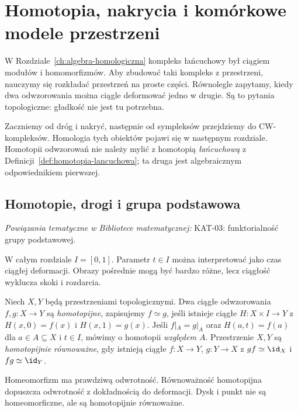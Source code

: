 \chapter{Homotopia, nakrycia i komórkowe modele przestrzeni}
\label{ch:topologia-algebraiczna-podstawy}

\providecommand{\atlasref}[2]{#2}


W Rozdziale~\ref{ch:algebra-homologiczna} kompleks łańcuchowy
był ciągiem modułów i homomorfizmów. Aby zbudować taki
kompleks z przestrzeni, nauczymy się rozkładać przestrzeń
na proste części. Równolegle zapytamy, kiedy dwa odwzorowania
można ciągle deformować jedno w drugie. Są to pytania
topologiczne: gładkość nie jest tu potrzebna.

Zaczniemy od dróg i nakryć, następnie od sympleksów
przejdziemy do CW-kompleksów. Homologia tych obiektów
pojawi się w następnym rozdziale. Homotopii odwzorowań
nie należy mylić z homotopią \emph{łańcuchową}
z Definicji~\ref{def:homotopia-lancuchowa};
ta druga jest algebraicznym odpowiednikiem pierwszej.

\section{Homotopie, drogi i grupa podstawowa}
\label{sec:homotopie-pi1}

\noindent\emph{Powiązania tematyczne w Bibliotece matematycznej:} \atlasref{KAT-03::def:funktor}{KAT-03: funktorialność grupy podstawowej}.


W całym rozdziale $I=[0,1]$. Parametr $t\in I$
można interpretować jako czas ciągłej deformacji.
Obrazy pośrednie mogą być bardzo różne, lecz
ciągłość wyklucza skoki i rozdarcia.

\begin{definicja}
\label{def:homotopia-topologiczna}
Niech $X,Y$ będą przestrzeniami topologicznymi.
Dwa ciągłe odwzorowania $f,g:X\to Y$ są
\emph{homotopijne}, zapisujemy $f\simeq g$,
jeśli istnieje ciągłe $H:X\times I\to Y$ z
$H(x,0)=f(x)$ i $H(x,1)=g(x)$.
Jeśli $f|_A=g|_A$ oraz $H(a,t)=f(a)$
dla $a\in A\subseteq X$ i $t\in I$,
mówimy o homotopii \emph{względem $A$}.
Przestrzenie $X,Y$ są \emph{homotopijnie
równoważne}, gdy istnieją ciągłe $f:X\to Y$,
$g:Y\to X$ z $gf\simeq\id_X$ i
$fg\simeq\id_Y$.
\end{definicja}

Homeomorfizm ma prawdziwą odwrotność.
Równoważność homotopijna dopuszcza odwrotność
z dokładnością do deformacji. Dysk i punkt
nie są homeomorficzne, ale są homotopijnie
równoważne.

